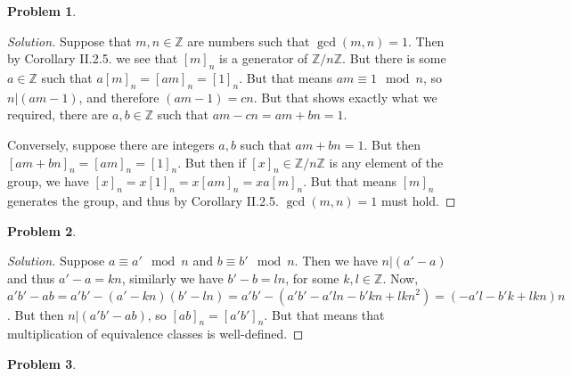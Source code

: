 \documentclass{article}
\theoremstyle{definition}
\newtheorem{problem-internal}{Problem}[subsection]
\newenvironment{problem}{
	\medskip
	\begin{problem-internal}
	}{
\end{problem-internal}
}
\newenvironment{solution}{
	\begin{proof}[Solution]
		\vspace{-8px}
		\setlength{\parskip}{4px}
		\setlength{\parindent}{0px}
	}{
\end{proof}
}
\begin{document}
\begin{problem}
\end{problem}

\begin{solution}
	Suppose that $m,n \in \mathbb{Z}$ are numbers such that $\gcd(m,n) = 1$. Then by Corollary II.2.5. we see that $[m]_n$ is a generator of $\mathbb{Z}/n\mathbb{Z}$. But there is some $a \in \mathbb{Z}$ such that $a[m]_n=[am]_n=[1]_n$. But that means $am \equiv 1 \mod n$, so $n | (am - 1)$, and therefore $(am - 1) = cn$. But that shows exactly what we required, there are $a,b \in \mathbb{Z}$ such that $am - cn = am + bn = 1$.
	
	Conversely, suppose there are integers $a, b$ such that $am+bn=1$. But then $[am+bn]_n=[am]_n=[1]_n$. But then if $[x]_n \in \mathbb{Z}/n\mathbb{Z}$ is any element of the group, we have $[x]_n=x[1]_n=x[am]_n=xa[m]_n$. But that means $[m]_n$ generates the group, and thus by Corollary II.2.5. $\gcd(m,n)=1$ must hold.
\end{solution}

\begin{problem}
\end{problem}

\begin{solution}
	Suppose $a \equiv a' \mod n$ and $b \equiv b' \mod n$. Then we have $n | (a' - a)$ and thus $a' - a = kn$, similarly we have $b' - b = ln$, for some $k,l \in \mathbb{Z}$. Now, $a'b'-ab=a'b'-(a'-kn)(b'-ln)=a'b'-(a'b'-a'ln-b'kn+lkn^2)=(-a'l-b'k+lkn)n$. But then $n | (a'b'-ab)$, so $[ab]_n=[a'b']_n$. But that means that multiplication of equivalence classes is well-defined.
\end{solution}

\begin{problem}
\end{problem}
\end{document}

